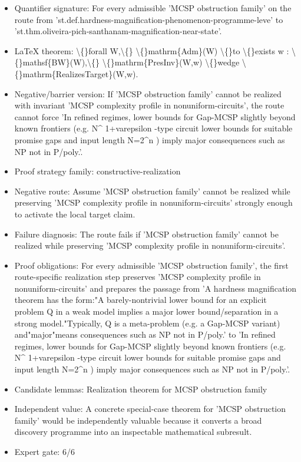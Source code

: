 \documentclass[11pt]{article}
\begin{document}
\begin{itemize}
\item Quantifier signature: For every admissible 'MCSP obstruction family' on the route from 'st.def.hardness-magnification-phenomenon-programme-leve' to 'st.thm.oliveira-pich-santhanam-magnification-near-state'.
\item LaTeX theorem: \textbackslash\{\}forall W,\textbackslash\{\} \textbackslash\{\}mathrm\{Adm\}(W) \textbackslash\{\}to \textbackslash\{\}exists w : \textbackslash\{\}mathsf\{BW\}(W),\textbackslash\{\} \textbackslash\{\}mathrm\{PresInv\}(W,w) \textbackslash\{\}wedge \textbackslash\{\}mathrm\{RealizesTarget\}(W,w).
\item Negative/barrier version: If 'MCSP obstruction family' cannot be realized with invariant 'MCSP complexity profile in nonuniform-circuits', the route cannot force 'In refined regimes, lower bounds for Gap-MCSP slightly beyond known frontiers (e.g. N\textasciicircum{} 1+varepsilon -type circuit lower bounds for suitable promise gaps and input length N=2\textasciicircum{}n ) imply major consequences such as NP not in P/poly.'.
\item Proof strategy family: constructive-realization
\item Negative route: Assume 'MCSP obstruction family' cannot be realized while preserving 'MCSP complexity profile in nonuniform-circuits' strongly enough to activate the local target claim.
\item Failure diagnosis: The route fails if 'MCSP obstruction family' cannot be realized while preserving 'MCSP complexity profile in nonuniform-circuits'.
\item Proof obligations: For every admissible 'MCSP obstruction family', the first route-specific realization step preserves 'MCSP complexity profile in nonuniform-circuits' and prepares the passage from 'A hardness magnification theorem has the form:"A barely-nontrivial lower bound for an explicit problem Q in a weak model implies a major lower bound/separation in a strong model."Typically, Q is a meta-problem (e.g. a Gap-MCSP variant) and"major"means consequences such as NP not in P/poly.' to 'In refined regimes, lower bounds for Gap-MCSP slightly beyond known frontiers (e.g. N\textasciicircum{} 1+varepsilon -type circuit lower bounds for suitable promise gaps and input length N=2\textasciicircum{}n ) imply major consequences such as NP not in P/poly.'.
\item Candidate lemmas: Realization theorem for MCSP obstruction family
\item Independent value: A concrete special-case theorem for 'MCSP obstruction family' would be independently valuable because it converts a broad discovery programme into an inspectable mathematical subresult.
\item Expert gate: 6/6
\end{itemize}
\end{document}
